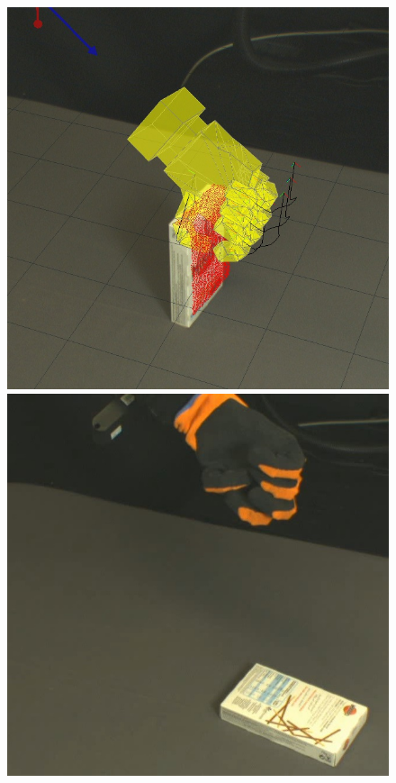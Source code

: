 \begin{figure}
\begin{center}
  \includegraphics[width=\tw]{images/experiments/query/chocsticks-1-s} \hspace{-6pt}
 \includegraphics[width=\tw]{images/experiments/exec/chocsticks-s}\\ [1ex]

\end{center}
\end{figure}
